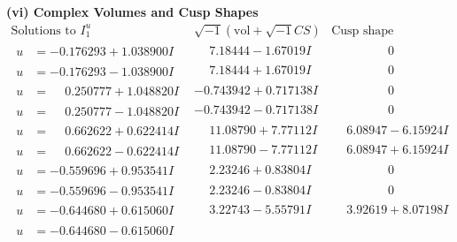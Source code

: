 \documentclass[1p]{elsarticle_modified}
\theoremstyle{definition}
\newcommand{\I}{\sqrt{-1}}
\begin{document}
\newpage\flushleft \textbf{(vi) Complex Volumes and Cusp Shapes}
$$\begin{array}{c|c|c}  
\text{Solutions to }I^u_{1}& \I (\text{vol} + \sqrt{-1}CS) & \text{Cusp shape}\\
 \hline 
\begin{aligned}
u &= -0.176293 + 1.038900 I\end{aligned}
 & \phantom{-}7.18444 - 1.67019 I & \phantom{-0.000000 } 0 \\ \hline\begin{aligned}
u &= -0.176293 - 1.038900 I\end{aligned}
 & \phantom{-}7.18444 + 1.67019 I & \phantom{-0.000000 } 0 \\ \hline\begin{aligned}
u &= \phantom{-}0.250777 + 1.048820 I\end{aligned}
 & -0.743942 + 0.717138 I & \phantom{-0.000000 } 0 \\ \hline\begin{aligned}
u &= \phantom{-}0.250777 - 1.048820 I\end{aligned}
 & -0.743942 - 0.717138 I & \phantom{-0.000000 } 0 \\ \hline\begin{aligned}
u &= \phantom{-}0.662622 + 0.622414 I\end{aligned}
 & \phantom{-}11.08790 + 7.77112 I & \phantom{-}6.08947 - 6.15924 I \\ \hline\begin{aligned}
u &= \phantom{-}0.662622 - 0.622414 I\end{aligned}
 & \phantom{-}11.08790 - 7.77112 I & \phantom{-}6.08947 + 6.15924 I \\ \hline\begin{aligned}
u &= -0.559696 + 0.953541 I\end{aligned}
 & \phantom{-}2.23246 + 0.83804 I & \phantom{-0.000000 } 0 \\ \hline\begin{aligned}
u &= -0.559696 - 0.953541 I\end{aligned}
 & \phantom{-}2.23246 - 0.83804 I & \phantom{-0.000000 } 0 \\ \hline\begin{aligned}
u &= -0.644680 + 0.615060 I\end{aligned}
 & \phantom{-}3.22743 - 5.55791 I & \phantom{-}3.92619 + 8.07198 I \\ \hline\begin{aligned}
u &= -0.644680 - 0.615060 I\end{aligned}

\end{array}$$
\end{document}

